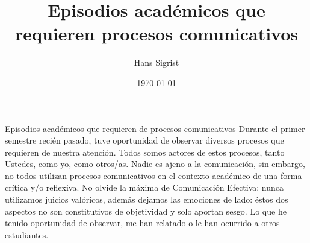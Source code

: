 \documentclass[12pt,spanish]{beamer}
\author{Hans Sigrist}
\date{\today}
\title{Episodios académicos que requieren procesos comunicativos}
\date{}
\institute[UAC]{UAC}
\begin{document}
\maketitle


\begin{frame}[label={sec:org85c7890}]{Episodios académicos que requieren de procesos comunicativos}
Durante el primer semestre recién pasado, tuve oportunidad de observar diversos procesos que requieren de nuestra atención. Todos somos actores de estos procesos, tanto Ustedes, como yo, como otros/as. Nadie es ajeno a la comunicación, sin embargo, no todos utilizan procesos comunicativos en el contexto académico de una forma crítica y/o reflexiva. No olvide la máxima de Comunicación Efectiva: nunca utilizamos juicios valóricos, además dejamos las emociones de lado: éstos dos aspectos no son constitutivos de objetividad y solo aportan sesgo. Lo que he tenido oportunidad de observar, me han relatado o le han ocurrido a otros estudiantes.
\end{frame}
\end{document}
